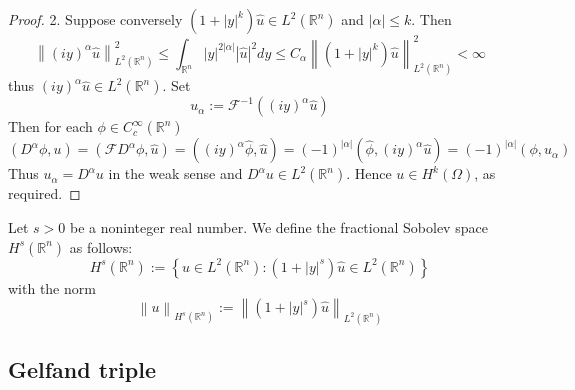 \begin{theorem}
\begin{proof}
        2. Suppose conversely
        $\left(1+|y|^k\right) \hat{u} \in L^2\left(\mathbb{R}^n\right)$
        and
        $\left|\alpha\right| \leq k$. Then
        \[
            \left\|(i y)^\alpha \hat{u}\right\|_{L^2\left(\mathbb{R}^n\right)}^2
            \leq
            \int_{\mathbb{R}^n}|y|^{2\left|\alpha\right|}|\hat{u}|^2 d y
            \leq
            C_\alpha \left\|\left(1+|y|^k\right) \hat{u}\right\|_{L^2\left(\mathbb{R}^n\right)}^2
            <
            \infty
        \]
        thus $(i y)^\alpha \hat{u} \in L^2\left(\mathbb{R}^n\right)$.
        Set
        \[
            u_\alpha
            :=
            \mathcal{F}^{-1}\left((i y)^\alpha \hat{u}\right)
        \]
        Then for each $\phi \in C_c^{\infty}\left(\mathbb{R}^n\right)$
        \[
            \left(D^\alpha \phi,u\right)
            =
            \left(\mathcal{F}D^\alpha \phi ,\hat{u}\right)
            =
            \left((i y)^\alpha \hat{\phi} ,\hat{u}\right)
            =
            (-1)^{\left|\alpha\right|} \left(\hat{\phi} ,(i y)^\alpha \hat{u}\right)
            =
            (-1)^{\left|\alpha\right|} \left(\phi ,u_\alpha\right)
        \]
        Thus $u_\alpha=D^\alpha u$ in the weak sense and $D^\alpha u \in L^2\left(\mathbb{R}^n\right)$. Hence $u \in H^k\left(\Omega\right)$, as required.
    \end{proof}
\end{theorem}

\begin{definition}
    Let $s>0$ be a noninteger real number.
    We define the fractional Sobolev space $H^s\left(\mathbb{R}^n\right)$ as follows:
    \begin{equation*}
        H^s\left(\mathbb{R}^n\right)
        :=
        \left\{u \in L^2\left(\mathbb{R}^n\right) : \left(1+|y|^s\right) \hat{u} \in L^2\left(\mathbb{R}^n\right)\right\}
    \end{equation*}
    with the norm
    \begin{equation*}
        \left\|u\right\|_{H^s\left(\mathbb{R}^n\right)}:=
        \left\|\left(1+\left|y\right|^s\right) \hat{u}\right\|_{L^2\left(\mathbb{R}^n\right)}
    \end{equation*}

\end{definition}

\subsection{Gelfand triple}

